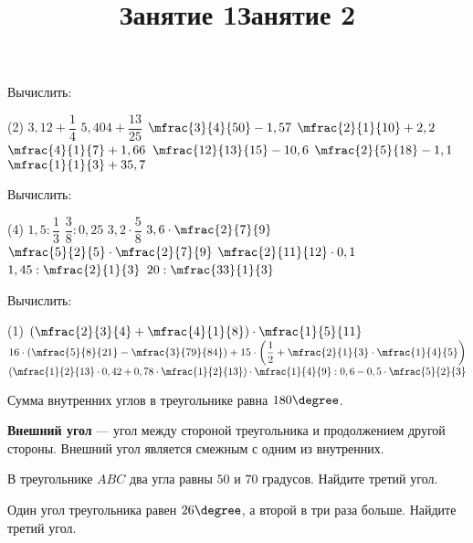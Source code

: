 %
%

\begin{class}[number=1-2]
	\title{Занятие 1}
	\begin{listofex}
		\item Вычислить:
		\begin{tasks}(2)
			\task \( 3,12+\dfrac{1}{4} \)
			\task \( 5,404+\dfrac{13}{25} \)
			\task \( \mfrac{3}{4}{50}-1,57\)
			\task \( \mfrac{2}{1}{10}+2,2 \)
			\task \( \mfrac{4}{1}{7}+1,66 \)
			\task \( \mfrac{12}{13}{15}-10,6 \)
			\task \( \mfrac{2}{5}{18}-1,1\)
			\task \( \mfrac{1}{1}{3}+35,7 \)
		\end{tasks}
		\item Вычислить:
		\begin{tasks}(4)
			\task \( 1,5 : \dfrac{1}{3} \)
			\task \( \dfrac{3}{8} : 0,25 \)
			\task \( 3,2 \cdot \dfrac{5}{8} \)
			\task \( 3,6 \cdot \mfrac{2}{7}{9} \)
			\task \( \mfrac{5}{2}{5} \cdot  \mfrac{2}{7}{9} \)
			\task \( \mfrac{2}{11}{12} \cdot 0,1 \)
			\task \( 1,45 : \mfrac{2}{1}{3} \)
			\task \( 20 : \mfrac{33}{1}{3} \)
		\end{tasks}
		\item Вычислить:
		\begin{tasks}(1)
			\task \( \left(  \mfrac{2}{3}{4} + \mfrac{4}{1}{8} \right) \cdot \mfrac{1}{5}{11} \)
			\task \( 16 \cdot \left( \mfrac{5}{8}{21} - \mfrac{3}{79}{84} \right) + 15 \cdot \left( \dfrac{1}{2} + \mfrac{2}{1}{3} \cdot \mfrac{1}{4}{5} \right) \)
			\task \( \left( \mfrac{1}{2}{13} \cdot 0,42 + 0,78 \cdot \mfrac{1}{2}{13} \right) \cdot \mfrac{1}{4}{9} : 0,6 - 0,5 \cdot \mfrac{5}{2}{3} \)
		\end{tasks}
	\newpage
	\title{Занятие 2}
	\end{listofex}
	\begin{definit}
		Сумма внутренних углов в треугольнике равна \( 180\degree \).
	\end{definit}
	\begin{definit}
		\textbf{Внешний угол} --- угол между стороной треугольника и продолжением другой стороны. Внешний угол является смежным с одним из внутренних.
	\end{definit}
	\begin{listofex}
		\item В треугольнике \( ABC \) два угла равны \( 50\) и \( 70 \) градусов. Найдите третий угол.
		\item Один угол треугольника равен \( 26\degree \), а второй в три раза больше. Найдите третий угол.

\end{listofex}
\end{class}
